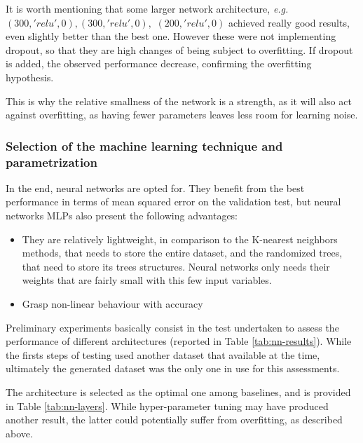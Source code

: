 It is worth mentioning that some larger network architecture, \textit{e.g.} $(300, 'relu', 0), (300, 'relu', 0),$ $(200, 'relu', 0)$ achieved really good results, even slightly better than the best one. However these were not implementing dropout, so that they are high changes of being subject to overfitting. If dropout is added, the observed performance decrease, confirming the overfitting hypothesis.

This is why the relative smallness of the network is a strength, as it will also act against overfitting, as having fewer parameters leaves less room for learning noise.

\subsubsection{Selection of the machine learning technique and parametrization}

In the end, neural networks are opted for. They benefit from the best performance in terms of mean squared error on the validation test, but neural networks MLPs also present the following advantages:
\begin{itemize}
    \item They are relatively lightweight, in comparison to the K-nearest neighbors methods, that needs to store the entire dataset, and the randomized trees, that need to store its trees structures. Neural networks only needs their weights that are fairly small with this few input variables.
    \item Grasp non-linear behaviour with accuracy
\end{itemize}

Preliminary experiments basically consist in the test undertaken to assess the performance of different architectures (reported in Table \ref{tab:nn-results}). While the firsts steps of testing used another dataset that available at the time, ultimately the generated dataset was the only one in use for this assessments.

The architecture is selected as the optimal one among baselines, and is provided in Table \ref{tab:nn-layers}. While hyper-parameter tuning may have produced another result, the latter could potentially suffer from overfitting, as described above. 

